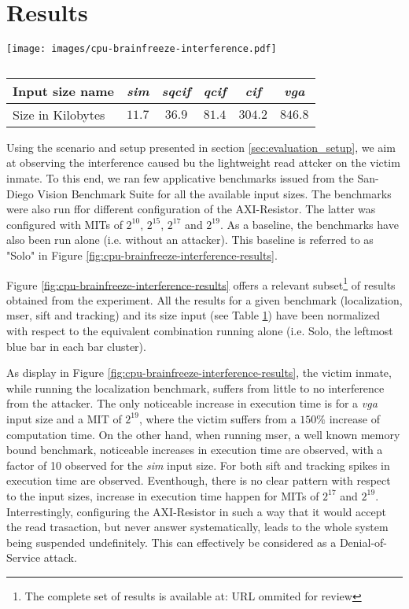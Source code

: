 \section{Results}
    \label{sec:results}
    \begin{figure*}
        \centering
        \texttt{[image: images/cpu-brainfreeze-interference.pdf]}
        \caption{}
        \label{fig:cpu-brainfreeze-interference-results}
    \end{figure*}

    \begin{table}
        \centering
        \caption{}
        \label{tab:sd-vbs-input-sizes}
        \begin{tabular}{|l||c|c|c|c|c|}
            \hline
            Input size name  & \emph{sim} & \emph{sqcif} & \emph{qcif} & \emph{cif} & \emph{vga} \\
            \hline
            Size in Kilobytes &  $11.7$ &    $36.9$ &   $81.4$ & $304.2$ & $846.8$ \\
            \hline
        \end{tabular}
    \end{table}

    Using the scenario and setup presented in section \ref{sec:evaluation_setup}, we aim at observing the interference caused bu the lightweight read attcker on the victim inmate. To this end, we ran few applicative benchmarks issued from the San-Diego Vision Benchmark Suite \cite{SD-VBS} for all the available input sizes. The benchmarks were also run ffor different configuration of the AXI-Resistor. The latter was configured with MITs of $2^{10}$, $2^{15}$, $2^{17}$ and $2^{19}$. As a baseline, the benchmarks have also been run alone (i.e. without an attacker). This baseline is referred to as "Solo" in Figure \ref{fig:cpu-brainfreeze-interference-results}.

    Figure \ref{fig:cpu-brainfreeze-interference-results} offers a relevant subset\footnote{The complete set of results is available at: URL ommited for review} of results obtained from the experiment. All the results for a given benchmark (localization, mser, sift and tracking) and its size input (see Table \ref{tab:sd-vbs-input-sizes}) have been normalized with respect to the equivalent combination running alone (i.e. Solo, the leftmost blue bar in each bar cluster).

    As display in Figure \ref{fig:cpu-brainfreeze-interference-results}, the victim inmate, while running the localization benchmark, suffers from little to no interference from the attacker. The only noticeable increase in execution time is for a \emph{vga} input size and a MIT of $2^{19}$, where the victim suffers from a $150\%$ increase of computation time.
    On the other hand, when running mser, a well known memory bound benchmark, noticeable increases in execution time are observed, with a factor of 10 observed for the \emph{sim} input size.
    For both sift and tracking spikes in execution time are observed. Eventhough, there is no clear pattern with respect to the input sizes, increase in execution time happen for MITs of $2^{17}$ and $2^{19}$.\\

    Interrestingly, configuring the AXI-Resistor in such a way that it would accept the read trasaction, but never answer systematically, leads to the whole system being suspended undefinitely. This can effectively be considered as a Denial-of-Service attack.
